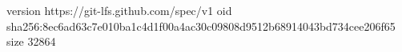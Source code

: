 version https://git-lfs.github.com/spec/v1
oid sha256:8ec6ad63c7e010ba1c4d1f00a4ac30c09808d9512b68914043bd734cee206f65
size 32864
